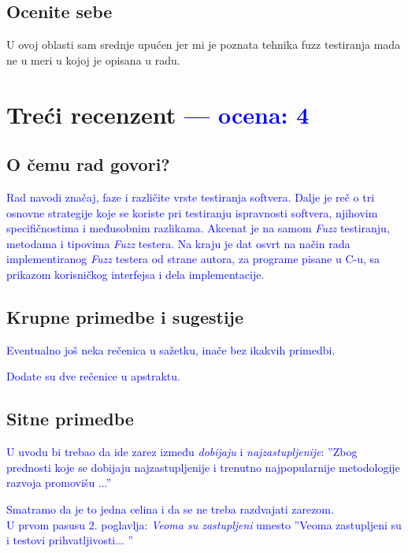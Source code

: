 \documentclass[a4paper]{report}
\newcommand{\odgovor}[1]{\textcolor{blue}{#1}}
\begin{document}
\section{Ocenite sebe}
U ovoj oblasti sam srednje upućen jer mi je poznata tehnika fuzz testiranja mada ne u meri u kojoj je opisana u radu.


\chapter{Treći recenzent \odgovor{--- ocena: 4} }
\section{O čemu rad govori?}

\odgovor {Rad navodi značaj, faze i različite vrste testiranja softvera. Dalje je reč o tri osnovne strategije koje se koriste pri testiranju ispravnosti softvera, njihovim specifičnostima i međusobnim razlikama. Akcenat je na samom \textit{Fuzz} testiranju, metodama i tipovima \textit{Fuzz} testera. Na kraju je dat osvrt na način rada implementiranog \textit{Fuzz} testera od strane autora, za programe pisane u C-u, sa prikazom korisničkog interfejsa i dela implementacije. }


\section{Krupne primedbe i sugestije}
\odgovor {Eventualno još neka rečenica u sažetku, inače bez ikakvih primedbi.} 

\odgovor {
Dodate su dve rečenice u apstraktu.
}
\section{Sitne primedbe}

\odgovor {
U uvodu bi trebao da ide zarez između \textit {dobijaju} i  \textit {najzastupljenije}:
''Zbog prednosti koje se dobijaju najzastupljenije i trenutno najpopularnije metodologije razvoja promovišu ...''  } 

\odgovor {
Smatramo da je to jedna celina i da se ne treba razdvajati zarezom.
} \\

\odgovor {U prvom pasusu 2. poglavlja:
\textit {Veoma su zastupljeni} umesto ''Veoma zastupljeni su i testovi prihvatljivosti... '' } 
\end{document}
